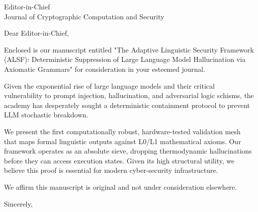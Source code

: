 \documentclass[11pt]{letter}
\begin{document}
\begin{letter}{Editor-in-Chief \\ Journal of Cryptographic Computation and Security}
\opening{Dear Editor-in-Chief,}

Enclosed is our manuscript entitled "The Adaptive Linguistic Security Framework (ALSF): Deterministic Suppression of Large Language Model Hallucination via Axiomatic Grammars" for consideration in your esteemed journal. 

Given the exponential rise of large language models and their critical vulnerability to prompt injection, hallucination, and adversarial logic schisms, the academy has desperately sought a deterministic containment protocol to prevent LLM stochastic breakdown.

We present the first computationally robust, hardware-tested validation mesh that maps formal linguistic outputs against L0/L1 mathematical axioms. Our framework operates as an absolute sieve, dropping thermodynamic hallucinations before they can access execution states. Given its high structural utility, we believe this proof is essential for modern cyber-security infrastructure.

We affirm this manuscript is original and not under consideration elsewhere.

\closing{Sincerely,}
\end{letter}
\end{document}

